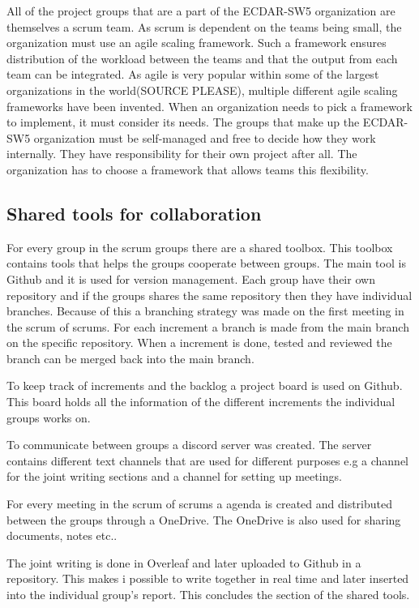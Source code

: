 All of the project groups that are a part of the ECDAR-SW5 organization are themselves a scrum team. 
As scrum is dependent on the teams being small, the organization must use an agile scaling framework. 
Such a framework ensures distribution of the workload between the teams and that the output from each team can be integrated. 
As agile is very popular within some of the largest organizations in the world(SOURCE PLEASE), multiple different agile scaling frameworks have been invented. 
When an organization needs to pick a framework to implement, it must consider its needs. 
The groups that make up the ECDAR-SW5 organization must be self-managed and free to decide how they work internally. They have responsibility for their own project after all. The organization has to choose a framework that allows teams this flexibility.




\subsection{Shared tools for collaboration}
For every group in the scrum groups there are a shared toolbox.
This toolbox contains tools that helps the groups cooperate between groups.
The main tool is Github and it is used for version management.  
Each group have their own repository and if the groups shares the same repository then they have individual branches.
Because of this a branching strategy was made on the first meeting in the scrum of scrums.
For each increment a branch is made from the main branch on the specific repository. 
When a increment is done, tested and reviewed the branch can be merged back into the main branch.

To keep track of increments and the backlog a project board is used on Github.
This board holds all the information of the different increments the individual groups works on.

To communicate between groups a discord server was created.
The server contains different text channels that are used for different purposes e.g a channel for the joint writing sections and a channel for setting up meetings.

For every meeting in the scrum of scrums a agenda is created and distributed between the groups through a OneDrive.
The OneDrive is also used for sharing documents, notes etc..

The joint writing is done in Overleaf and later uploaded to Github in a repository.
This makes i possible to write together in real time and later inserted into the individual group's report.
This concludes the section of the shared tools.